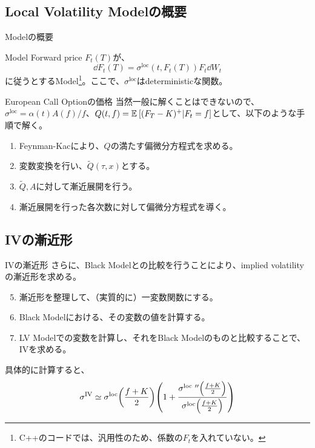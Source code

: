 \documentclass[dvipdfmx,9pt]{beamer}
\begin{document}
\subsection{Local Volatility Modelの概要}
\begin{frame}{Modelの概要}
  \begin{block}{Model}
    Forward price $F_{t}(T)$が、
    \begin{equation}
      \dd F_{t}(T) = \sigma^{\mathrm{loc}}(t,F_{t}(T)) F_{t} \dd W_{t}
    \end{equation}
    に従うとするModel\footnote{C++のコードでは、汎用性のため、係数の$F_{t}$を入れていない。}。ここで、$\sigma^{\mathrm{loc}}$はdeterministicな関数。
  \end{block}
  \begin{block}{European Call Optionの価格}
    当然一般に解くことはできないので、$\sigma^{\mathrm{loc}} = \alpha(t)A(f)/f$、$Q(t,f) = \exv[]{(F_{T} - K)^{+}|F_{t}=f}$として、以下のような手順で解く。
    \begin{enumerate}
      \item Feynman-Kacにより、$Q$の満たす偏微分方程式を求める。
      \item 変数変換を行い、$\tilde{Q}(\tau,x)$とする。
      \item $\tilde{Q},A$に対して漸近展開を行う。
      \item 漸近展開を行った各次数に対して偏微分方程式を導く。
    \end{enumerate}
  \end{block}
\end{frame}

\subsection{IVの漸近形}
\begin{frame}
  \begin{block}{IVの漸近形}
    さらに、Black Modelとの比較を行うことにより、implied volatilityの漸近形を求める。
    \begin{enumerate}
      \setcounter{enumi}{4}
      \item 漸近形を整理して、（実質的に）一変数関数にする。
      \item Black Modelにおける、その変数の値を計算する。
      \item LV Modelでの変数を計算し、それをBlack Modelのものと比較することで、IVを求める。
    \end{enumerate}
    具体的に計算すると、
    \begin{equation}
      \sigma^{\mathrm{IV}} \simeq \sigma^{\mathrm{loc}}\pqty{\frac{f+K}{2}}\pqty{1 + \frac{\sigma^{\mathrm{\mathrm{loc}}~\prime\prime}\pqty{\frac{f+K}{2}}}{\sigma^{\mathrm{loc}}\pqty{\frac{f+K}{2}}}}
    \end{equation}
  \end{block}
\end{frame}
\end{document}
